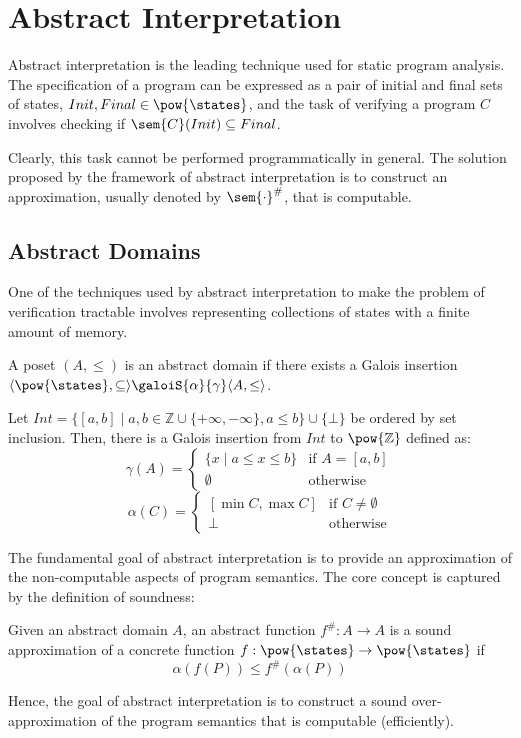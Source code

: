 \section{Abstract Interpretation}

Abstract interpretation \cite{Cousot77} is the leading technique used for static 
program analysis. The specification of a program can be expressed as a pair of 
initial and final sets of states, $Init, Final \in \pow{\states}$, and the task 
of verifying a program $C$ involves checking if $\sem{C}(Init) \subseteq Final$.

Clearly, this task cannot be performed programmatically in general. The solution 
proposed by the framework of abstract interpretation is to construct an 
approximation, usually denoted by $\sem{\cdot}^\#$, that is computable.

\subsection{Abstract Domains}

One of the techniques used by abstract interpretation to make the problem of 
verification tractable involves representing collections of states with a finite 
amount of memory.

\begin{definition}
  A poset $(A, \leq)$ is an abstract domain if there exists a Galois insertion
  $\langle \pow{\states}, \subseteq \rangle \galoiS{\alpha}{\gamma} \langle A, 
  \leq \rangle$.
\end{definition}

\begin{example}
  \label{exmp:interval}
  Let $Int = \{ [a, b] \mid a, b \in \mathbb{Z} \cup \{+\infty, -\infty \}, a 
  \leq b \} \cup \{ \bot \}$ be ordered by set inclusion. Then, there is a 
  Galois insertion from $Int$ to $\pow{\mathbb{Z}}$ defined as:
  $$\gamma(A) = \begin{cases}
    \{ x \mid a \leq x \leq b \} & \text{if } A = [a, b] \\
    \emptyset & \text{otherwise}
  \end{cases}$$
  $$\alpha(C) = \begin{cases}
    [\min C, \max C] & \text{if } C \neq \emptyset \\
    \bot & \text{otherwise}
  \end{cases}$$
\end{example}

The fundamental goal of abstract interpretation is to provide an approximation 
of the non-computable aspects of program semantics. The core concept is captured 
by the definition of soundness:

\begin{definition}[Soundness]
  Given an abstract domain $A$, an abstract function $f^\# : A \to A$ is a 
  sound approximation of a concrete function $f : \pow{\states} \to 
  \pow{\states}$ if
  $$\alpha(f(P)) \leq f^\#(\alpha(P))$$
\end{definition}

Hence, the goal of abstract interpretation is to construct a sound 
over-approximation of the program semantics that is computable (efficiently).
